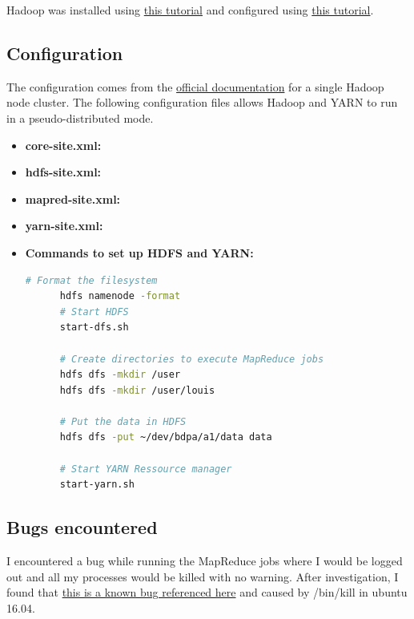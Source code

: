 \documentclass[a4paper,12pt]{article}
\begin{document}
Hadoop was installed using \href{https://www.digitalocean.com/community/tutorials/how-to-install-hadoop-in-stand-alone-mode-on-ubuntu-16-04}{this tutorial} and configured using \href{https://hadoop.apache.org/docs/stable/hadoop-project-dist/hadoop-common/SingleCluster.html}{this tutorial}.


\subsection{Configuration}
The configuration comes from the \href{https://hadoop.apache.org/docs/stable/hadoop-project-dist/hadoop-common/SingleCluster.html}{official documentation} for a single Hadoop node cluster.
The following configuration files allows Hadoop and YARN to run in a pseudo-distributed mode.
\begin{itemize}
    \item \textbf{core-site.xml:}
    
    \item \textbf{hdfs-site.xml:}
    
    \item \textbf{mapred-site.xml:}
    
    \item \textbf{yarn-site.xml:}
    
    \item \textbf{Commands to set up HDFS and YARN:}
    \begin{lstlisting}[language=bash]
      # Format the filesystem
      hdfs namenode -format
      # Start HDFS
      start-dfs.sh

      # Create directories to execute MapReduce jobs
      hdfs dfs -mkdir /user
      hdfs dfs -mkdir /user/louis

      # Put the data in HDFS
      hdfs dfs -put ~/dev/bdpa/a1/data data

      # Start YARN Ressource manager
      start-yarn.sh
    \end{lstlisting}
\end{itemize}


\subsection{Bugs encountered}
I encountered a bug while running the MapReduce jobs where I would be logged out and all my processes would be killed with no warning.
After investigation, I found that \href{https://bugs.launchpad.net/ubuntu/+source/procps/+bug/1610499}{this is a known bug referenced here} and caused by /bin/kill in ubuntu 16.04.
\end{document}
